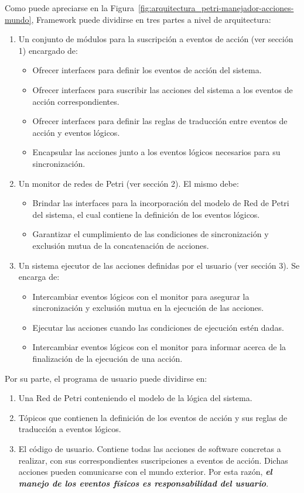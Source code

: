 Como puede apreciarse en la
Figura~\ref{fig:arquitectura_petri-manejador-acciones-mundo}, \nombreFramework
Framework puede dividirse en tres partes a nivel de arquitectura:
\begin{enumerate}
  \item Un conjunto de módulos para la suscripción a eventos de acción (ver
  sección 1) encargado de:
  \begin{itemize}
    \item Ofrecer interfaces para definir los eventos de acción del sistema.
    \item Ofrecer interfaces para suscribir las acciones del sistema a los
    eventos de acción correspondientes.
    \item Ofrecer interfaces para definir las reglas de traducción entre eventos
    de acción y eventos lógicos.
    \item Encapsular las acciones junto a los eventos lógicos necesarios para su
    sincronización.
  \end{itemize}
\item Un monitor de redes de Petri (ver sección 2). El mismo debe:
	\begin{itemize}
	  \item Brindar las interfaces para la incorporación del modelo de Red de Petri
	  del sistema, el cual contiene la definición de los eventos
	  lógicos.
	  \item Garantizar el cumplimiento de las condiciones de sincronización y
	  exclusión mutua de la concatenación de acciones.
	\end{itemize}
\item Un sistema ejecutor de las acciones definidas por el usuario (ver sección 3). 
  Se encarga de:
  \begin{itemize}
	  \item Intercambiar eventos lógicos con el monitor para asegurar la
	  sincronización y exclusión mutua en la ejecución de las acciones.
	  \item Ejecutar las acciones cuando las condiciones de ejecución
	  estén dadas.
	  \item Intercambiar eventos lógicos con el monitor para informar acerca de la
	  finalización de la ejecución de una acción.
	\end{itemize}
\end{enumerate}

Por su parte, el programa de usuario puede dividirse en:
\begin{enumerate}
  \item Una Red de Petri conteniendo el modelo de la lógica del sistema.
  \item Tópicos que contienen la definición de los eventos de acción y sus
  reglas de traducción a eventos lógicos.
  \item El código de usuario. Contiene todas las acciones de software
	concretas a realizar, con sus correspondientes suscripciones a eventos
	de acción. Dichas acciones pueden comunicarse con el mundo exterior. Por esta
	razón, \textbf{\emph{el manejo de los eventos físicos es responsabilidad del
	usuario}}.
\end{enumerate}

